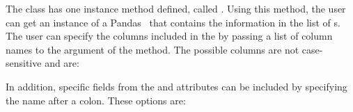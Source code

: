 \documentclass[12pt]{ussci}
\begin{document}
The  class has one instance method defined, called
. Using this method, the user can get an instance of a
Pandas~\autocite{pandas}  that contains the information in the
list of s. The user can specify the columns included in the
 by passing a list of column names to the
 argument of the  method. The
possible columns are not case-sensitive and are:

\noindent\begin{itemize*}
    \item {}
    \item {}
    \item {}
    \item {}
    \item {}
    \item {}
    \item {}
    \item {}
    \item {}
    \item {}
    \item {}
\end{itemize*}

In addition, specific fields from the  and 
attributes can be included by specifying the name after a colon. These options
are:

\noindent\begin{itemize*}
    \item {}
    \item {}
    \item {}
    \item {}
    \item {}
    \item {}
    \item {}
    \item {}
\end{itemize*}

\noindent\begin{itemize*}
    \item {}
    \item {}
\end{itemize*}
\end{document}
